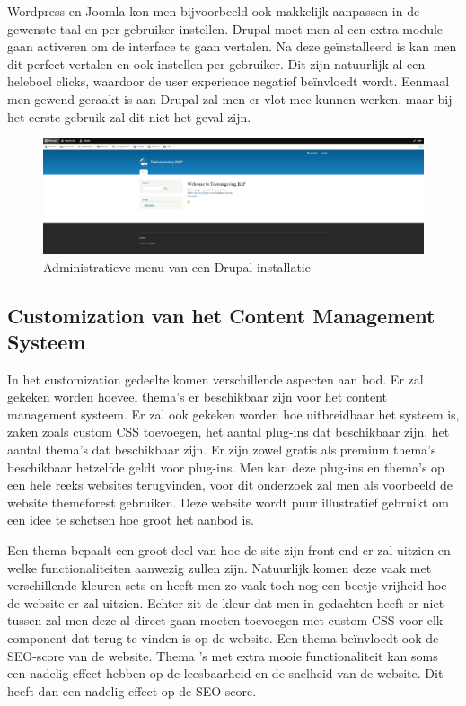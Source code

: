 Wordpress en Joomla kon men bijvoorbeeld ook makkelijk aanpassen in de gewenste taal en per gebruiker instellen. Drupal moet men al een extra module gaan activeren om de interface te gaan vertalen. Na deze geïnstalleerd is kan men dit perfect vertalen en ook instellen per gebruiker. Dit zijn natuurlijk al een heleboel clicks, waardoor de user experience negatief beïnvloedt wordt. Eenmaal men gewend geraakt is aan Drupal zal men er vlot mee kunnen werken, maar bij het eerste gebruik zal dit niet het geval zijn.

\begin{figure}
    \centering
    \includegraphics[scale = 0.2]{img/Drupal_Admin.png}
    \caption{Administratieve menu van een Drupal installatie}
    \label{fig:adminDrupal}
\end{figure}

\subsection{Customization van het Content Management Systeem}
In het customization gedeelte komen verschillende aspecten aan bod. Er zal gekeken worden hoeveel thema's er beschikbaar zijn voor het content management systeem. Er zal ook gekeken worden hoe uitbreidbaar het systeem is, zaken zoals custom CSS toevoegen, het aantal plug-ins dat beschikbaar zijn, het aantal thema's dat beschikbaar zijn. Er zijn zowel gratis als premium thema's beschikbaar hetzelfde geldt voor plug-ins. Men kan deze plug-ins en thema's op een hele reeks websites terugvinden, voor dit onderzoek zal men als voorbeeld de website themeforest gebruiken. Deze website wordt puur illustratief gebruikt om een idee te schetsen hoe groot het aanbod is.

Een thema bepaalt een groot deel van hoe de site zijn front-end er zal uitzien en welke functionaliteiten aanwezig zullen zijn. Natuurlijk komen deze vaak met verschillende kleuren sets en heeft men zo vaak toch nog een beetje vrijheid hoe de website er zal uitzien. Echter zit de kleur dat men in gedachten heeft er niet tussen zal men deze al direct gaan moeten toevoegen met custom CSS voor elk component dat terug te vinden is op de website. Een thema beïnvloedt ook de SEO-score van de website. Thema 's met extra mooie functionaliteit kan soms een nadelig effect hebben op de leesbaarheid en de snelheid van de website. Dit heeft dan een nadelig effect op de SEO-score.

